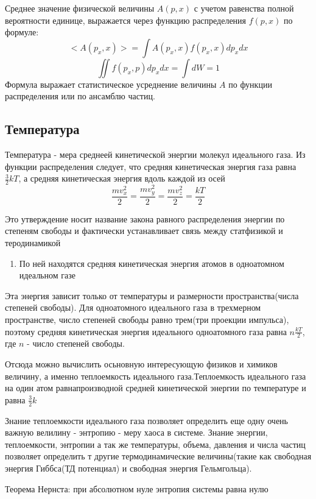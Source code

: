 \documentclass{article}
\begin{document}
Среднее значение физической величины $A(p,x)$ с учетом равенства полной вероятности единице, выражается через функцию распределения $f(p,x)$ по формуле:
$$<A(p_x,x)> =\int A(p_x,x)f(p_x,x)dp_xdx$$
$$\iint f(p_x,p)dp_xdx = \int dW = 1$$
Формула выражает статистическое усреднение величины $A$ по функции распределения или по ансамблю частиц.

\subsection{Температура}

Температура - мера среднеей кинетической энергии молекул идеального газа. Из функции распределения следует, что средняя кинетическая энергия газа равна $\frac 32 kT$, а средняя кинетическая энергия вдоль каждой из осей $$\frac{mv_x^2}2=\frac{mv_y^2}2=\frac{mv_z^2}2 = \frac{kT}2$$

Это утверждение носит название закона равного распределения энергии по степеням свободы и фактически устанавливает связь между статфизикой и теродинамикой

\begin{enumerate}
 функция распределения Максвелла
\item По ней находятся средняя кинетическая энергия атомов в одноатомном идеальном газе
\end{enumerate}

Эта энергия зависит только от температуры и размерности пространства(числа степеней свободы). Для одноатомного идеального газа в трехмерном пространстве, число степеней свободы равно трем(три проекции импульса), поэтому средняя кинетическая энергия идеального одноатомного газа равна $n\frac{kT}2$, где $n$ - число степеней свободы. 

Отсюда можно вычислить осьновную интересующую физиков и химиков величину, а именно теплоемкость идеального газа.Теплоемкость идеального газа на один атом равнапроизводной средней кинетической энергии по температуре и равна $\frac 32 k$

Знание теплоемкости идеального газа позволяет определить еще одну очень важную велилину - энтропию - меру хаоса в системе. Знание энергии, теплоемкости, энтропии а так же температуры, объема, давления и числа частиц позволяет определить т другие термодинамические величины(такие как свободная энергия Гиббса(ТД потенциал) и свободная энергия Гельмгольца).

Теорема Нернста: при абсолютном нуле энтропия системы равна нулю
\end{document}
